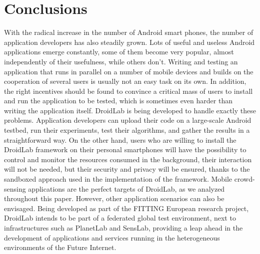 \documentclass[conference,letterpaper]{IEEEtran}
\begin{document}
\section{Conclusions}
\label{sec:conclusion_and_future_work}
With the radical increase in the number of Android smart phones, the number of application developers has also steadily grown. Lots of useful and useless Android applications emerge constantly, some of them become very popular, almost independently of their usefulness, while others don't. Writing and testing an application that runs in parallel on a number of mobile devices and builds on the cooperation of several users is usually not an easy task on its own. In addition, the right incentives should be found to convince a critical mass of users to install and run the application to be tested, which is sometimes even harder than writing the application itself. DroidLab is being developed to handle exactly these problems. Application developers can upload their code on a large-scale Android testbed, run their experiments, test their algorithms, and gather the results in a straightforward way. On the other hand, users who are willing to install the DroidLab framework on their personal smartphones will have the possibility to control and monitor the resources consumed in the background, their interaction will not be needed, but their security and privacy will be ensured, thanks to the sandboxed approach used in the implementation of the framework.  Mobile crowd-sensing applications are the perfect targets of DroidLab, as we analyzed throughout this paper. However, other application scenarios can also be envisaged. Being developed as part of the FITTING European research project, DroidLab intends to be part of a federated global test environment, next to infrastructures such as PlanetLab and SensLab, providing a leap ahead in the development of applications and services running in the heterogeneous environments of the Future Internet.       


\end{document}
